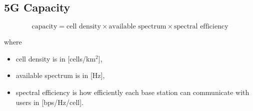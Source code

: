 \subsection {5G Capacity}

\begin{equation*}
    \text{capacity} = \text{cell density} \times \text{available spectrum} \times \text{spectral efficiency}
\end{equation*}

where
\begin{itemize}
    \item cell density is in [cells/km$^2$],
    \item available spectrum is in [Hz],
    \item spectral efficiency is how efficiently each base station can communicate with users in [bps/Hz/cell].
\end{itemize}